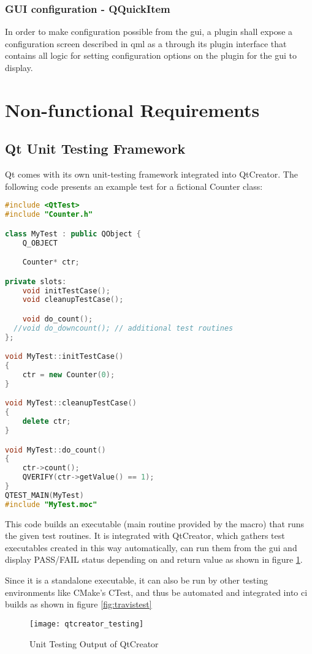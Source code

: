 \subsubsection{GUI configuration - QQuickItem}
In order to make configuration possible from the \gls{gui}, a plugin shall expose a configuration screen described in \gls{qml} as a  through its plugin interface that contains all logic for setting configuration options on the plugin for the \gls{gui} to display.

\section{Non-functional Requirements}

\subsection{Qt Unit Testing Framework}\label{sec:archqttest}
Qt comes with its own unit-testing framework integrated into QtCreator. The following code presents an example test for a fictional Counter class:

\begin{lstlisting}[caption=Unit Test for a Counter class,language=c++]
#include <QtTest>
#include "Counter.h"

class MyTest : public QObject {
    Q_OBJECT

    Counter* ctr;

private slots:
    void initTestCase();
    void cleanupTestCase();

    void do_count();
  //void do_downcount(); // additional test routines
};

void MyTest::initTestCase()
{
	ctr = new Counter(0);
}

void MyTest::cleanupTestCase()
{
    delete ctr;
}

void MyTest::do_count()
{
	ctr->count();
	QVERIFY(ctr->getValue() == 1);
}
QTEST_MAIN(MyTest)
#include "MyTest.moc"
\end{lstlisting}

This code builds an executable (main routine provided by the  macro) that runs the given test routines.
It is integrated with QtCreator, which gathers test executables created in this way automatically, can run them from the \gls{gui} and display PASS/FAIL status depending on  and return value as shown in figure \ref{fig:qtctest}.

Since it is a standalone executable, it can also be run by other testing environments like CMake's CTest, and thus be automated and integrated into \gls{ci} builds as shown in figure \ref{fig:travistest}
\begin{figure}[htb]
	\texttt{[image: qtcreator\_testing]}
	\caption{Unit Testing Output of QtCreator}
	\label{fig:qtctest}
\end{figure}

